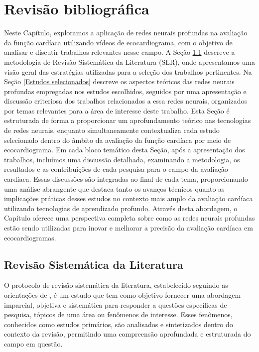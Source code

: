 \chapter{Revisão bibliográfica}
\label{Revisão bibliográfica}

Neste Capítulo, exploramos a aplicação de redes neurais profundas na avaliação da função cardíaca utilizando vídeos de ecocardiograma, com o objetivo de analisar e discutir trabalhos relevantes nesse campo.  A Seção \ref{Revisão Sistemática da Literatura} descreve a metodologia de Revisão Sistemática da Literatura (SLR), onde apresentamos uma visão geral das estratégias utilizadas para a seleção dos trabalhos pertinentes. Na Seção \ref{Estudos selecionados} descreve os aspectos teóricos das redes neurais profundas empregadas nos estudos escolhidos, seguidos por uma apresentação e discussão criteriosa dos trabalhos relacionados a essa redes neurais, organizados por temas relevantes para a área de interesse deste trabalho. Esta Seção é estruturada de forma a proporcionar um aprofundamento teórico nas tecnologias de redes neurais, enquanto simultaneamente contextualiza cada estudo selecionado dentro do âmbito da avaliação da função cardíaca por meio de ecocardiograma.
 Em cada bloco temático desta Seção, após a apresentação dos trabalhos, incluímos uma discussão detalhada, examinando a metodologia, os resultados e as contribuições de cada pesquisa para o campo da avaliação cardíaca. Essas discussões são integradas ao final de cada tema, proporcionando uma análise abrangente que destaca tanto os avanços técnicos quanto as implicações práticas desses estudos no contexto mais amplo da avaliação cardíaca utilizando tecnologias de aprendizado profundo. Através desta abordagem, o Capítulo oferece uma perspectiva completa sobre como as redes neurais profundas estão sendo utilizadas para inovar e melhorar a precisão da avaliação cardíaca em ecocardiogramas.

\section{Revisão Sistemática da Literatura}
\label{Revisão Sistemática da Literatura}

O protocolo de revisão sistemática da literatura, estabelecido seguindo as orientações de \cite{kitchenham2009systematic}, é um estudo que tem como objetivo fornecer uma abordagem imparcial, objetiva e sistemática para responder a questões específicas de pesquisa, tópicos de uma área ou fenômenos de interesse. Esses fenômenos, conhecidos como estudos primários, são analisados e sintetizados dentro do contexto da revisão, permitindo uma compreensão aprofundada e estruturada do campo em questão.

